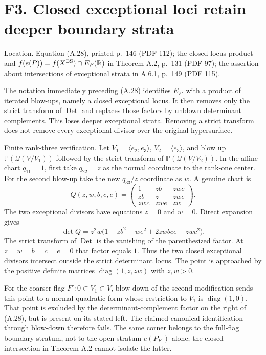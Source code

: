 \documentclass[10pt]{article}
\begin{document}
\section*{F3. Closed exceptional loci retain deeper boundary strata}
Location. Equation (A.28), printed p. 146 (PDF 112); the closed-locus product and \(f(e(P))=f(X^{\rm BS})\cap E_P(\mathbb R)\) in Theorem A.2, p. 131 (PDF 97); the assertion about intersections of exceptional strata in A.6.1, p. 149 (PDF 115).\par
The notation immediately preceding (A.28) identifies \(E_{F'}\) with a product of iterated blow-ups, namely a closed exceptional locus. It then removes only the strict transform of \(\operatorname{Det}\) and replaces those factors by unblown determinant complements. This loses deeper exceptional strata. Removing a strict transform does not remove every exceptional divisor over the original hypersurface.\par
Finite rank-three verification. Let \(V_1=\langle e_2,e_3\rangle\), \(V_2=\langle e_3\rangle\), and blow up \(\mathbb P(\mathcal Q(V/V_1))\) followed by the strict transform of \(\mathbb P(\mathcal Q(V/V_2))\). In the affine chart \(q_{11}=1\), first take \(q_{22}=z\) as the normal coordinate to the rank-one center. For the second blow-up take the new \(q_{33}/z\) coordinate as \(w\). A genuine chart is \[Q(z,w,b,c,e)=
 \begin{pmatrix}
 1&zb&zwc\\
 zb&z&zwe\\
 zwc&zwe&zw
 \end{pmatrix}.\] The two exceptional divisors have equations \(z=0\) and \(w=0\). Direct expansion gives \[\det Q=z^2w
 \bigl(1-zb^2-we^2+2zwbce-zwc^2\bigr).\] The strict transform of \(\operatorname{Det}\) is the vanishing of the parenthesized factor. At \(z=w=b=c=e=0\) that factor equals \(1\). Thus the two closed exceptional divisors intersect outside the strict determinant locus. The point is approached by the positive definite matrices \(\operatorname{diag}(1,z,zw)\) with \(z,w>0\).\par
For the coarser flag \(F':0\subset V_1\subset V\), blow-down of the second modification sends this point to a normal quadratic form whose restriction to \(V_1\) is \(\operatorname{diag}(1,0)\). That point is excluded by the determinant-complement factor on the right of (A.28), but is present on its stated left. The claimed canonical identification through blow-down therefore fails. The same corner belongs to the full-flag boundary stratum, not to the open stratum \(e(P_{F'})\) alone; the closed intersection in Theorem A.2 cannot isolate the latter.\par
\end{document}
